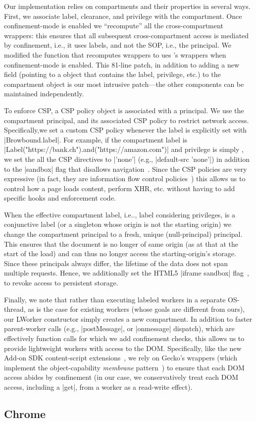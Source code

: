 Our implementation relies on compartments and their properties in
several ways.
%
First, we associate label, clearance, and privilege with the
compartment.
%
Once confinement-mode is enabled we ``recompute'' all the
cross-compartment wrappers: this ensures that all subsequent
cross-compartment access is mediated by confinement, i.e., it uses
labels, and not the SOP, i.e., the principal.
%
We modified the function that recomputes wrappers to ues \sys{}'s
wrappers when confinement-mode is enabled.
%
This 81-line patch, in addition to adding a new field (pointing to a \sys{}
object that contains the label, privilege, etc.) to the compartment object is
our most intrusive patch---the other \sys{} components can be maintained
independently.
 
%
To enforce CSP, a CSP policy object is associated with a principal.
We use the compartment principal, and its associated CSP policy to
restrict network access.
%
Specifically,we set a custom CSP policy whenever the label is
explicitly set with \js|Browbound.label|.
%
For example, if the compartment label is
\js|Label("https://bank.ch").and("https://amazon.com")| and privilege
is simply , we set the all the CSP directives to
\js|'none'| (e.g., \js|default-src 'none'|) in addition to the
\js|sandbox| flag that disallows
navigation~\cite{csp1.1,whatwg-html,html5}.
%
Since the CSP policies are very expressive (in fact, they are
information flow control policies~\cite{yang:2013:towards}) this
allows us to control how a page loads content, perform XHR, etc.
without having to add \sys{} specific hooks and enforcement code.

When the effective compartment label, i.e.., label considering
privileges, is a conjunctive label (or a singleton whose origin is not
the starting origin) we change the compartment principal to a fresh,
unique (null-principal) principal.
%
This ensures that the document is no longer of same origin (as at that
at the start of the load) and can thus no longer access the
starting-origin's storage.
%
Since these principals always differ, the lifetime of the data does
not span multiple requests.
%
Hence, we additionally set the HTML5 \js|iframe sandbox| flag~\cite{html5},
to revoke access to persistent storage.
%

Finally, we note that rather than executing labeled workers in a
separate OS-thread, as is the case for existing workers (whose goals
are different from ours), our LWorker constructor simply creates a new
compartment.
%
In addition to faster parent-worker calls (e.g.,
\js|postMessage|, or \js|onmessage| dispatch), which are effectively function
calls for which we add confinement checks,
%
this allows us to provide lightweight workers with access to the DOM.
%
Specifically, like the new Add-on SDK content-script
extensions~\cite{addon-sdk}, we rely on Gecko's wrappers (which implement the
object-capability \emph{membrane}
pattern~\cite{miller2003paradigm,miller2006robust}) to ensure that each DOM
access abides by confinement (in our case, we conservatively treat each DOM
access, including a \js|get|, from a worker as a read-write effect).
%

\subsection{Chrome}
\label{sec:implementation:firefox}



